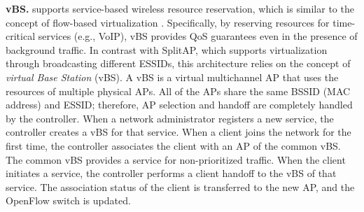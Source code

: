 %
\textbf{vBS.} \cite{vBS} supports service-based wireless resource reservation, which is similar to the concept of flow-based virtualization \cite{sherwood2009flowvisor}.
Specifically, by reserving resources for time-critical services (e.g., VoIP), vBS provides QoS guarantees even in the presence of background traffic.
%
%
In contrast with SplitAP, which supports virtualization through broadcasting different ESSIDs, this architecture relies on the concept of \textit{virtual Base Station} (vBS).
A vBS is a virtual multichannel AP that uses the resources of multiple physical APs.
All of the APs share the same BSSID (MAC address) and ESSID; therefore, AP selection and handoff are completely handled by the controller.
When a network administrator registers a new service, the controller creates a vBS for that service.
When a client joins the network for the first time, the controller associates the client with an AP of the common vBS.
The common vBS provides a service for non-prioritized traffic.
When the client initiates a service, the controller performs a client handoff to the vBS of that service.
The association status of the client is transferred to the new AP, and the OpenFlow switch is updated.



